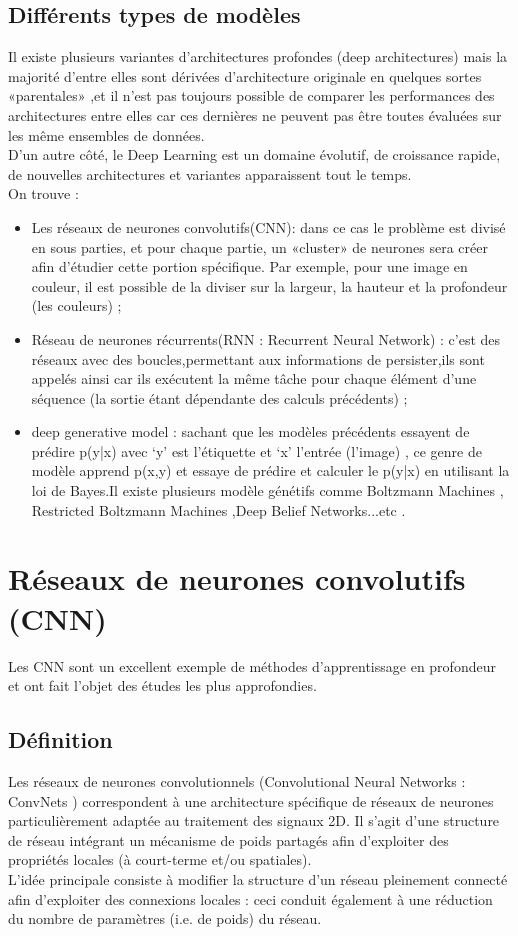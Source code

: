 \subsection{Différents types de modèles }
Il existe plusieurs variantes d’architectures profondes (deep architectures) mais la majorité d’entre elles sont dérivées d’architecture originale en quelques sortes «parentales» ,et il n’est pas toujours possible de comparer les performances des architectures entre elles car ces dernières ne peuvent pas être toutes évaluées sur les même ensembles de données.\\
D’un autre côté, le Deep Learning est un domaine évolutif, de croissance rapide, de nouvelles architectures et variantes apparaissent tout le temps.\\
On trouve :
\begin{itemize}
    \item Les réseaux de neurones convolutifs(CNN): dans ce cas le problème est divisé en sous parties, et pour chaque partie, un «cluster» de neurones sera créer afin d’étudier cette portion spécifique. Par exemple, pour une image en couleur, il est possible de la diviser sur la largeur, la hauteur et la profondeur (les couleurs) ;
    \item Réseau de neurones récurrents(RNN : Recurrent Neural Network) : c'est des réseaux avec des boucles,permettant aux informations de persister,ils  sont appelés ainsi car ils exécutent la même tâche pour chaque élément d’une séquence (la sortie étant dépendante des calculs précédents) \cite{50};
   \item deep generative model : sachant que les modèles précédents essayent de prédire p(y|x) avec ‘y’ est l’étiquette et  ‘x’  l’entrée (l’image) , ce genre de modèle apprend p(x,y) et essaye de prédire et calculer le p(y|x) en utilisant la loi de Bayes\cite{49}.Il existe plusieurs modèle génétifs comme Boltzmann Machines \cite{51}, Restricted Boltzmann Machines \cite{52,53} ,Deep Belief Networks\cite{54}...etc .

\end{itemize}

\section{Réseaux de neurones convolutifs (CNN)}

Les CNN sont un excellent exemple de méthodes d’apprentissage en profondeur et ont fait l’objet des études les plus approfondies.

\subsection{Définition}
Les réseaux de neurones convolutionnels (Convolutional Neural Networks : ConvNets ) correspondent à une architecture spécifique de réseaux de neurones particulièrement adaptée au traitement des signaux 2D. Il s’agit d’une structure de réseau intégrant un mécanisme de poids partagés afin d’exploiter des propriétés locales (à court-terme et/ou spatiales).\\ L’idée principale consiste à modifier la structure d’un réseau pleinement connecté afin d’exploiter des
connexions locales : ceci conduit également à une réduction du nombre de paramètres (i.e. de poids)
du réseau.
